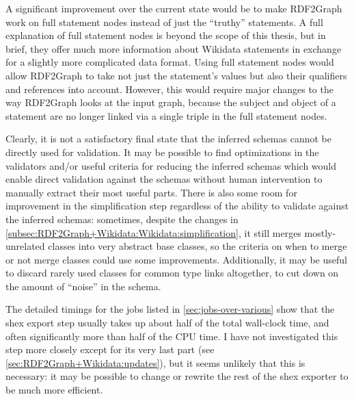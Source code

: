 A significant improvement over the current state
would be to make \gls{RDF2Graph} work on full \gls{statement} nodes instead of just the “truthy” \glspl{statement}.
A full explanation of full \gls{statement} nodes is beyond the scope of this thesis,
but in brief, they offer much more information about \gls{Wikidata} \glspl{statement}
in exchange for a slightly more complicated data format.
Using full \gls{statement} nodes would allow \gls{RDF2Graph} to take not just the \gls{statement}’s values
but also their \glspl{qualifier} and \glspl{reference} into account.
However, this would require major changes to the way \gls{RDF2Graph} looks at the input graph,
because the \gls{subject} and \gls{object} of a \gls{statement} are no longer linked via a single \gls{triple}
in the full \gls{statement} nodes.

Clearly, it is not a satisfactory final state
that the inferred \glspl{schema} cannot be directly used for validation.
It may be possible to find optimizations in the validators
and/or useful criteria for reducing the inferred \glspl{schema}
which would enable direct validation against the \glspl{schema}
without human intervention to manually extract their most useful parts.
There is also some room for improvement in the simplification step
regardless of the ability to validate against the inferred \glspl{schema}:
sometimes, despite the changes in \cref{subsec:RDF2Graph+Wikidata:Wikidata:simplification},
it still merges mostly-unrelated classes into very abstract base classes,
so the criteria on when to merge or not merge classes could use some improvements.
Additionally, it may be useful to discard rarely used classes for common \glspl{type link} altogether,
to cut down on the amount of “noise” in the schema.

The detailed timings for the jobs listed in \cref{sec:jobs-over-various}
show that the \gls{shex} export step usually takes up about half of the total wall-clock time,
and often significantly more than half of the CPU time.
I have not investigated this step more closely except for its very last part
(see \cref{sec:RDF2Graph+Wikidata:updates}),
but it seems unlikely that this is necessary:
it may be possible to change or rewrite the rest of the \gls{shex} exporter to be much more efficient.

